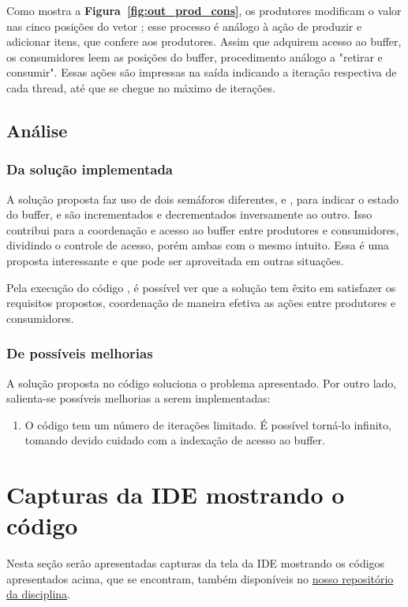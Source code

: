 \documentclass[
	12pt,				%
	openright,			%
	oneside,			%
	a4paper,			%
	chapter=TITLE,		%
	english,			%
	french,				%
	spanish,			%
	brazil				%
	]{abntex2}
\theoremstyle{definition}
\begin{document}
Como mostra a \textbf{Figura~\ref{fig:out_prod_cons}}, os produtores modificam o valor nas cinco posições do vetor ; esse processo é análogo à ação de produzir e adicionar itens, que confere aos produtores. Assim que adquirem acesso ao buffer, os consumidores leem as posições do buffer, procedimento análogo a "retirar e consumir". Essas ações são impressas na saída indicando a iteração respectiva de cada thread, até que se chegue no máximo de iterações.

\subsection{Análise}
\subsubsection{Da solução implementada}
A solução proposta faz uso de dois semáforos diferentes,  e , para indicar o estado do buffer, e são incrementados e decrementados inversamente ao outro. Isso contribui para a coordenação e acesso ao buffer entre produtores e consumidores, dividindo o controle de acesso, porém ambas com o mesmo intuito. Essa é uma proposta interessante e que pode ser aproveitada em outras situações.

Pela execução do código , é possível ver que a solução tem êxito em satisfazer os requisitos propostos, coordenação de maneira efetiva as ações entre produtores e consumidores.

\subsubsection{De possíveis melhorias}
A solução proposta no código  soluciona o problema apresentado. Por outro lado, salienta-se possíveis melhorias a serem implementadas:
\begin{enumerate}
    \item  O código tem um número de iterações limitado. É possível torná-lo infinito, tomando devido cuidado com a indexação de acesso ao buffer.
\end{enumerate}

\section{Capturas da IDE mostrando o código}
Nesta seção serão apresentadas capturas da tela da IDE mostrando os códigos apresentados acima, que se encontram, também disponíveis no
\href{https://github.com/jvictorferreira3301/Sistemas_Operacionais}{nosso repositório da disciplina}.
\end{document}
